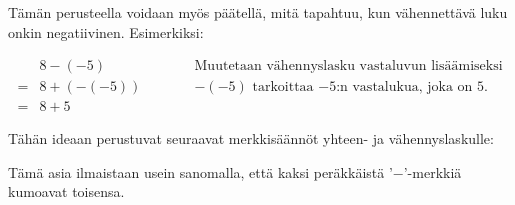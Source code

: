Tämän perusteella voidaan myös päätellä, mitä tapahtuu, kun vähennettävä luku onkin negatiivinen. Esimerkiksi:

\begin{align*}
&8-(-5)&\quad\quad\quad\textrm{Muutetaan vähennyslasku vastaluvun lisäämiseksi}\\
= &8+(-(-5))&\quad\quad\quad\textrm{$-(-5)$ tarkoittaa $-5$:n vastalukua, joka on 5.}\\
= &8+5
\end{align*}

Tähän ideaan perustuvat seuraavat merkkisäännöt yhteen- ja vähennyslaskulle:


Tämä asia ilmaistaan usein sanomalla, että kaksi peräkkäistä '$-$'-merkkiä kumoavat toisensa.


